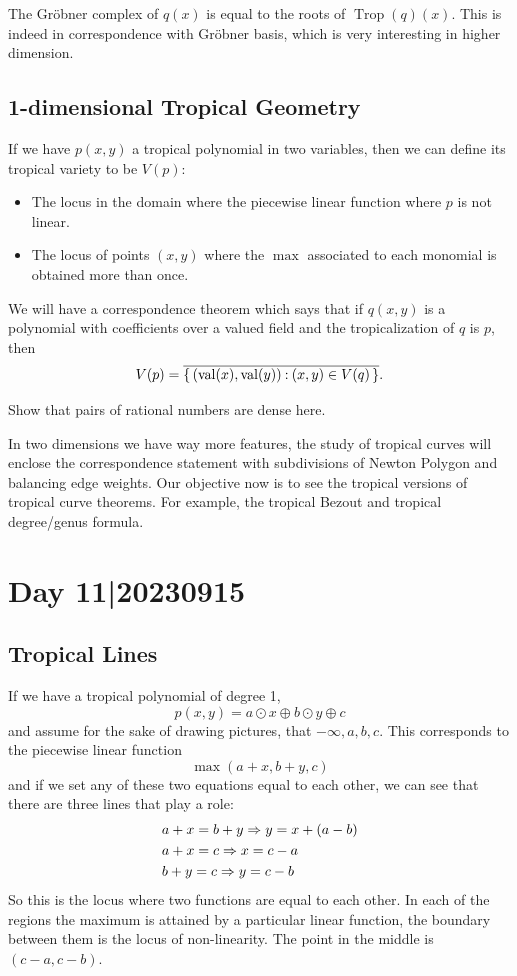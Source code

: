 \documentclass[12pt]{memoir}
\DeclareMathOperator{\val}{val}
\DeclareMathOperator{\Trop}{Trop}
\begin{document}
The Gr\"obner complex of $q(x)$ is equal to the roots of $\Trop(q)(x)$. This is indeed in correspondence with Gr\"obner basis, which is very interesting in higher dimension. 

\subsection{1-dimensional Tropical Geometry}

If we have $p(x,y)$ a tropical polynomial in two variables, then we can define its tropical variety to be $V(p)$:
\begin{itemize}
    \item The locus in the domain where the piecewise linear function where $p$ is not linear.
    \item The locus of points $(x,y)$ where the $\max$ associated to each monomial is obtained more than once.
\end{itemize}

We will have a correspondence theorem which says that if $q(x,y)$ is a polynomial with coefficients over a valued field and the tropicalization of $q$ is $p$, then 
$$V(p)=\ov{\set{(\val(x),\val(y))\: (x,y)\in V(q)}}.$$
\begin{Ej}
Show that pairs of rational numbers are dense here. 
\end{Ej}
In two dimensions we have way more features, the study of tropical curves will enclose the correspondence statement with subdivisions of Newton Polygon and balancing edge weights. Our objective now is to see the tropical versions of tropical curve theorems. For example, the tropical Bezout and tropical degree/genus formula.

\section{Day 11|20230915}

\subsection{Tropical Lines}

If we have a tropical polynomial of degree 1, 
$$p(x,y)=a\odot x\oplus b\odot y\oplus c$$
and assume for the sake of drawing pictures, that $-\infty,a,b,c$. This corresponds to the piecewise linear function 
$$\max(a+x,b+y,c)$$
and if we set any of these two equations equal to each other, we can see that there are three lines that play a role:
\begin{align*}
    &a+x=b+y\Rightarrow y=x+(a-b)\\
    &a+x=c\Rightarrow x=c-a\\
    &b+y=c\Rightarrow y=c-b
\end{align*}
So this is the locus where two functions are equal to each other. In each of the regions the maximum is attained by a particular linear function, the boundary between them is the locus of non-linearity. The point in the middle is $(c-a,c-b)$. 
\end{document}
